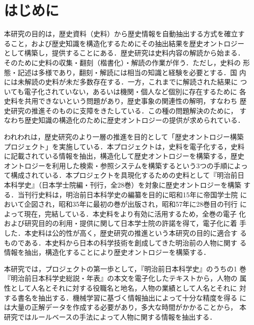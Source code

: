 \documentclass[japanese]{jnlp_1.4}
\begin{document}
\maketitle



\section{はじめに}

本研究の目的は，歴史資料（史料）から歴史情報を自動抽出する方式を確立す
ること，および歴史知識を構造化するためにその抽出結果を歴史オントロジー
として構築し，提供することにある．歴史研究は史料内容の解読から始まる．
そのために史料の収集・翻刻（楷書化）・解読の作業が伴う．ただし，史料の
形態・記述は多様であり，翻刻・解読には相当の知識と経験を必要とする．国
内には未解読の史料が未だ多数存在する．一方，これまでに解読された結果に
ついても電子化されていない，あるいは機関・個人など個別に存在するために
各史料を共用できないという問題があり，歴史事象の関連性の解明，すなわち
歴史研究の推進そのものに支障をきたしている．この種の問題解決のために，
すなわち歴史知識の構造化のために歴史オントロジーの提供が求められている．

われわれは，歴史研究のより一層の推進を目的として「歴史オントロジー構築
プロジェクト」を実施している．本プロジェクトは，史料を電子化する，史料
に記載されている情報を抽出，構造化して歴史オントロジーを構築する，歴史
オントロジーを利用した検索・参照システムを構築するという3つの手順によっ
て構成されている．本プロジェクトを具現化するための史料として『明治前日
本科学史』（日本学士院編・刊行，全28巻）を対象に歴史オントロジーを構築
する．当刊行史料は，明治前日本科学史の編纂を目的に昭和15年に帝国学士院
において企図され，昭和35年に最初の巻が出版され，昭和57年に28巻目の刊行
によって現在，完結している．本史料をより有効に活用するため，全巻の電子
化および研究目的の利用・提供に関して日本学士院の許諾を得て，電子化に着
手した．本史料は公的性が高く，歴史研究の推進という本研究の目的に適合す
るものである．本史料から日本の科学技術を創成してきた明治前の人物に関す
る情報を抽出，構造化することにより歴史オントロジーを構築する．

本研究では，プロジェクトの第一歩として，『明治前日本科学史』のうちの1 
巻『明治前日本科学史総説・年表』の本文を電子化したテキストから，人物の
属性として人名とそれに対する役職名と地名，人物の業績として人名とそれに
対する書名を抽出する．機械学習に基づく情報抽出によって十分な精度を得る
には大量の正解データを作成する必要があり，多大な時間がかかることから，
本研究ではルールベースの手法によって人物に関する情報を抽出する．
\end{document}
